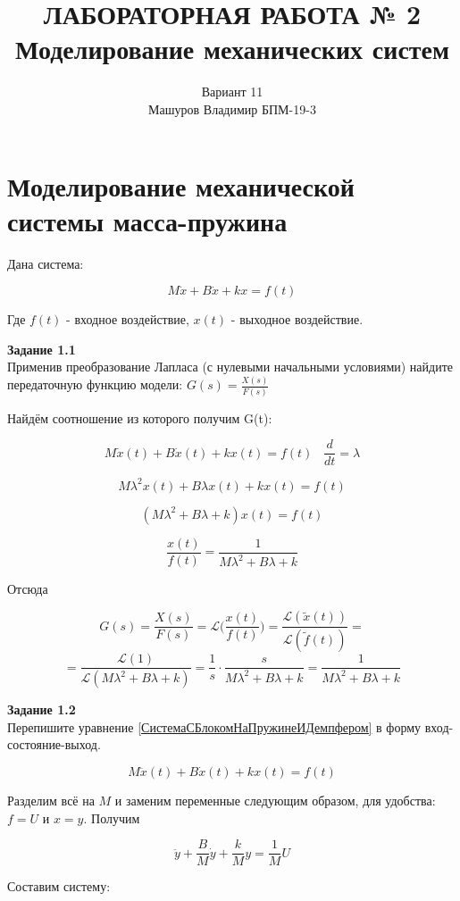 \documentclass[a4paper, 12pt]{article}
\title{ЛАБОРАТОРНАЯ РАБОТА № 2 \\
Моделирование механических систем
}
\author{Вариант 11 \\ Машуров Владимир БПМ-19-3}
\begin{document}
\maketitle
\thispagestyle{empty}
\newpage
\tableofcontents

\section{Моделирование механической системы масса-пружина}

Дана система:

\begin{equation}
M\dot{x} + B\dot{x} + kx = f(t)
\label{СистемаСБлокомНаПружинеИДемпфером}
\end{equation}

Где $f(t)$ - входное воздействие, $x(t)$ - выходное воздействие.
 
\textbf{Задание 1.1 } \\
Применив преобразование Лапласа (с нулевыми начальными условиями) найдите передаточную функцию модели: $ G(s) = \frac{X(s)}{F(s)} $ 

Найдём соотношение из которого получим G(t):


$$M\dot{x}(t) + B\dot{x}(t) + kx(t) = f(t) \; \; \; \frac{d}{dt} = \lambda $$

$$ M\lambda^2x(t) + B\lambda x(t) + kx(t) = f(t) $$

$$ (M\lambda^2 + B\lambda + k)x(t) = f(t) $$

$$ \frac{x(t)}{f(t)} = \frac{1}{M\lambda^2 + B\lambda + k} $$

Отсюда

$$ G(s) = \frac{X(s)}{F(s)} = \mathcal{L} \bigg( \frac{x(t)}{f(t)} \bigg) = \frac{\mathcal{L}(\tilde{x}(t))}{\mathcal{L}(\tilde{f}(t))} = $$
$$ = \frac{\mathcal{L}(1)}{\mathcal{L}(M\lambda^2 + B\lambda + k)} =  \frac{1}{s} \cdot \frac{s}{M\lambda^2 + B\lambda + k} = \frac{1}{M\lambda^2 + B\lambda + k} $$

\textbf{Задание 1.2 } \\
Перепишите уравнение \ref{СистемаСБлокомНаПружинеИДемпфером} в форму вход-состояние-выход.

$$M\ddot{x}(t) + B\dot{x}(t) + kx(t) = f(t) $$ 

Разделим всё на $M$ и заменим переменные следующим образом, для удобства: $f = U$ и $x = y$. Получим 

$$ \ddot{y} + \frac{B}{M}\dot{y} + \frac{k}{M}y = \frac{1}{M}U $$

Составим систему:
\end{document}
